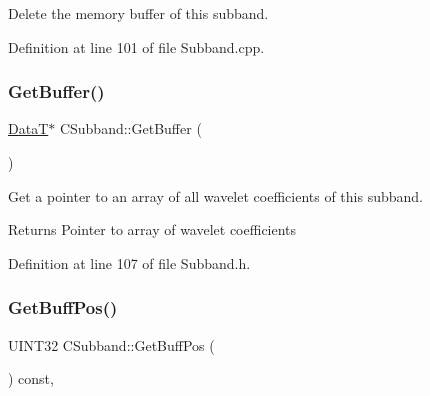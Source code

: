Delete the memory buffer of this subband. 



Definition at line 101 of file Subband.\+cpp.


\begin{DoxyCode}{0}

\end{DoxyCode}
\mbox{\label{classCSubband_aa4a60fd0c2e3ad2742bca6b8e819d5c5}} 
\subsubsection{\texorpdfstring{GetBuffer()}{GetBuffer()}}
{\footnotesize\ttfamily \mbox{\hyperlink{PGFtypes_8h_acb1ee3f52ccfad782dcaa0abd79e5d05}{DataT}}$\ast$ C\+Subband\+::\+Get\+Buffer (\begin{DoxyParamCaption}{ }\end{DoxyParamCaption})\hspace{0.3cm}{\ttfamily [inline]}}

Get a pointer to an array of all wavelet coefficients of this subband. \begin{DoxyReturn}{Returns}
Pointer to array of wavelet coefficients 
\end{DoxyReturn}


Definition at line 107 of file Subband.\+h.


\begin{DoxyCode}{0}

\end{DoxyCode}
\mbox{\label{classCSubband_a682074175296debbf4ca81a24cba0268}} 
\subsubsection{\texorpdfstring{GetBuffPos()}{GetBuffPos()}}
{\footnotesize\ttfamily U\+I\+N\+T32 C\+Subband\+::\+Get\+Buff\+Pos (\begin{DoxyParamCaption}{ }\end{DoxyParamCaption}) const\hspace{0.3cm}{\ttfamily [inline]}, {\ttfamily [private]}}



